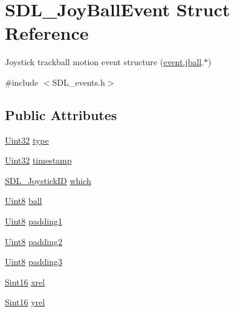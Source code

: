 \hypertarget{struct_s_d_l___joy_ball_event}{}\section{S\+D\+L\+\_\+\+Joy\+Ball\+Event Struct Reference}
\label{struct_s_d_l___joy_ball_event}


Joystick trackball motion event structure (\hyperlink{union_s_d_l___event_ae433f511e3383d17f8fe02df745ee8f8}{event.\+jball}.$\ast$)  




{\ttfamily \#include $<$S\+D\+L\+\_\+events.\+h$>$}

\subsection*{Public Attributes}
\begin{DoxyCompactItemize}
\item 
\hyperlink{_s_d_l__stdinc_8h_add440eff171ea5f55cb00c4a9ab8672d}{Uint32} \hyperlink{struct_s_d_l___joy_ball_event_a0b192b95a043cb494b27ed9b27e84db1}{type}
\item 
\hyperlink{_s_d_l__stdinc_8h_add440eff171ea5f55cb00c4a9ab8672d}{Uint32} \hyperlink{struct_s_d_l___joy_ball_event_aa8e4fb91af62e316bb9a3219ab76148d}{timestamp}
\item 
\hyperlink{_s_d_l__joystick_8h_a3c3d32500cb08f76ee8077983912c0bd}{S\+D\+L\+\_\+\+Joystick\+ID} \hyperlink{struct_s_d_l___joy_ball_event_a4e2e185717d529167cd0bea21093c454}{which}
\item 
\hyperlink{_s_d_l__stdinc_8h_a2944638813a090aa23e62f4da842c3e2}{Uint8} \hyperlink{struct_s_d_l___joy_ball_event_add4eb0daeaf95ae56e8c7cfcec560242}{ball}
\item 
\hyperlink{_s_d_l__stdinc_8h_a2944638813a090aa23e62f4da842c3e2}{Uint8} \hyperlink{struct_s_d_l___joy_ball_event_aff75a6519ca2a19cffdc14ebf4626613}{padding1}
\item 
\hyperlink{_s_d_l__stdinc_8h_a2944638813a090aa23e62f4da842c3e2}{Uint8} \hyperlink{struct_s_d_l___joy_ball_event_a0ea3071b99ac096b0157714f01ff04f8}{padding2}
\item 
\hyperlink{_s_d_l__stdinc_8h_a2944638813a090aa23e62f4da842c3e2}{Uint8} \hyperlink{struct_s_d_l___joy_ball_event_acb700712f1a4070bc114ef9d55b00640}{padding3}
\item 
\hyperlink{_s_d_l__stdinc_8h_a9d0257032c0e146ab6121bf0122712f5}{Sint16} \hyperlink{struct_s_d_l___joy_ball_event_a959a8473aa1964e5e1778c27a9ffd261}{xrel}
\item 
\hyperlink{_s_d_l__stdinc_8h_a9d0257032c0e146ab6121bf0122712f5}{Sint16} \hyperlink{struct_s_d_l___joy_ball_event_a28ad48a9eb7a5d3ff62ccba09fcead76}{yrel}
\end{DoxyCompactItemize}


